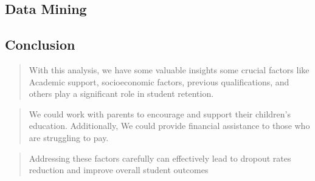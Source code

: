 \documentclass[
  letterpaper,
  DIV=11,
  numbers=noendperiod]{scrartcl}
\begin{document}
\hypertarget{data-mining}{%
\subsection{Data Mining}\label{data-mining}}

\hypertarget{conclusion}{%
\subsection{\texorpdfstring{\textbf{Conclusion}}{Conclusion}}\label{conclusion}}

\begin{quote}
With this analysis, we have some valuable insights some crucial factors
like Academic support, socioeconomic factors, previous qualifications,
and others play a significant role in student retention.
\end{quote}

\begin{quote}
We could work with parents to encourage and support their children's
education. Additionally, We could provide financial assistance to those
who are struggling to pay.
\end{quote}

\begin{quote}
Addressing these factors carefully can effectively lead to dropout rates
reduction and improve overall student outcomes
\end{quote}


\printbibliography
\end{document}
